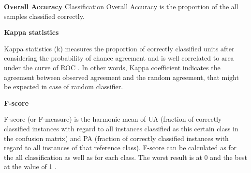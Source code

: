 \documentclass[parskip=full]{scrartcl}
\begin{document}
\textbf{Overall Accuracy}
Classification Overall Accuracy is the proportion of the all samples classified
correctly.

\textbf{Kappa statistics}

Kappa statistics (k) measures the proportion of correctly classified units after
considering the probability of chance agreement and is well correlated to area
under the curve of ROC \cite{Freeman2012}. In other words, Kappa coefficient
indicates the agreement between observed agreement and the random agreement,
that might be expected in case of random classifier.

\textbf{F-score}

F-score (or F-measure) is the harmonic mean of UA (fraction of correctly
classified instances with regard to all instances classified as this certain
class in the confusion matrix) and PA (fraction of correctly classified
instances with regard to all instances of that reference class). F-score can be
calculated as for the all classification as well as for each class. The worst
result is at 0 and the best at the value of 1 \cite{Inglada2017}.





\end{document}
